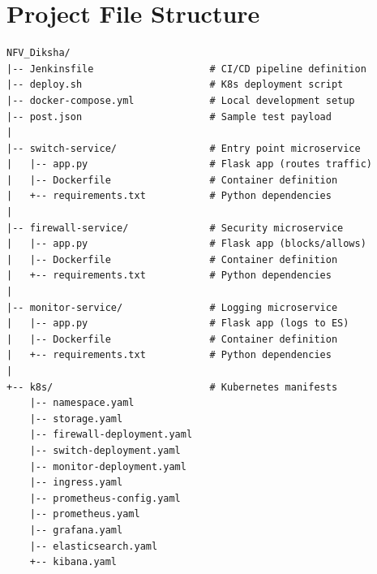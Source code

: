 \documentclass[12pt,a4paper]{article}
\begin{document}
\section{Project File Structure}

\begin{verbatim}
NFV_Diksha/
|-- Jenkinsfile                    # CI/CD pipeline definition
|-- deploy.sh                      # K8s deployment script
|-- docker-compose.yml             # Local development setup
|-- post.json                      # Sample test payload
|
|-- switch-service/                # Entry point microservice
|   |-- app.py                     # Flask app (routes traffic)
|   |-- Dockerfile                 # Container definition
|   +-- requirements.txt           # Python dependencies
|
|-- firewall-service/              # Security microservice
|   |-- app.py                     # Flask app (blocks/allows)
|   |-- Dockerfile                 # Container definition
|   +-- requirements.txt           # Python dependencies
|
|-- monitor-service/               # Logging microservice
|   |-- app.py                     # Flask app (logs to ES)
|   |-- Dockerfile                 # Container definition
|   +-- requirements.txt           # Python dependencies
|
+-- k8s/                           # Kubernetes manifests
    |-- namespace.yaml
    |-- storage.yaml
    |-- firewall-deployment.yaml
    |-- switch-deployment.yaml
    |-- monitor-deployment.yaml
    |-- ingress.yaml
    |-- prometheus-config.yaml
    |-- prometheus.yaml
    |-- grafana.yaml
    |-- elasticsearch.yaml
    +-- kibana.yaml
\end{verbatim}
\end{document}
